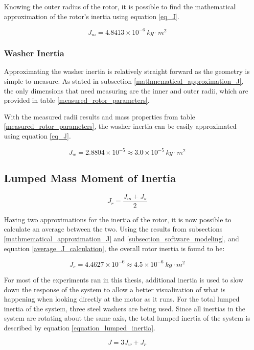 Knowing the outer radius of the rotor, it is possible to find the mathematical approximation of the rotor's inertia using equation \ref{eq_J}.

\[J_m = 4.8413 \times 10^{-6} \ kg \cdot m^2\]



\subsubsection{Washer Inertia}
Approximating the washer inertia is relatively straight forward as the geometry is simple to measure. As stated in subsection \ref{mathmematical_approximation_J}, the only dimensions that need measuring are the inner and outer radii, which are provided in table \ref{measured_rotor_parameters}.

With the measured radii results and mass properties from table \ref{measured_rotor_parameters}, the washer inertia can be easily approximated using equation \ref{eq_J}.

\[J_w = 2.8804 \times 10^{-5} \approx 3.0 \times 10^{-5}\ kg \cdot m^2 \]


\subsection{Lumped Mass Moment of Inertia}

\begin{equation}
\label{average_J_calculation}
J_r =  \frac{J_m + J_s}{2}
\end{equation}

Having two approximations for the inertia of the rotor, it is now possible to calculate an average between the two. Using the results from subsections \ref{mathmematical_approximation_J} and \ref{subsection_software_modeling}, and equation \ref{average_J_calculation}, the overall rotor inertia is found to be:

\[J_r =  4.4627 \times 10^{-6} \approx 4.5 \times 10^{-6} \ kg \cdot m^2 \]

For most of the experiments ran in this thesis, additional inertia is used to slow down the response of the system to allow a better visualization of what is happening when looking directly at the motor as it runs. For the total lumped inertia of the system, three steel washers are being used. Since all inertias in the system are rotating about the same axis, the total lumped inertia of the system is described by equation \ref{equation_lumped_inertia}.

\begin{equation}
\label{equation_lumped_inertia}
J = 3J_w + J_r
\end{equation}


